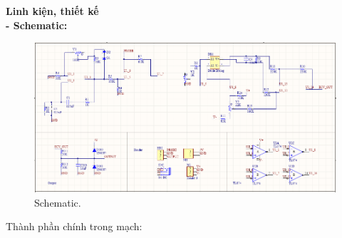 \documentclass[a4paper,12pt,oneside]{article}
\begin{document}
\noindent \textbf{Linh kiện, thiết kế}\\
\textbf{- Schematic:}
\begin{figure}[H]
\centering
\begin{center}
\includegraphics[scale=.6]{hinh/PPM/ppmschematic.png}
\end{center}
\caption{Schematic.}
\end{figure}
\noindent Thành phần chính trong mạch:
\end{document}
